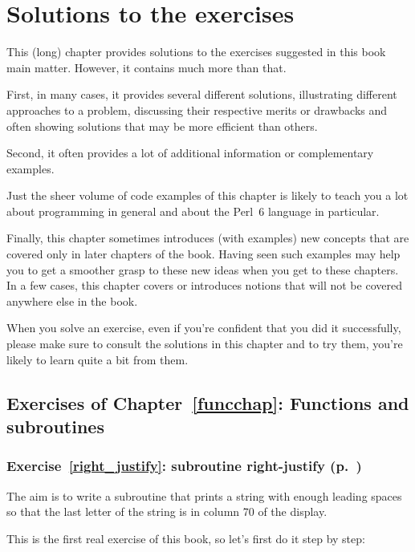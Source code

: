\chapter{Solutions to the exercises}

This (long) chapter provides solutions to the exercises 
suggested in this book main matter. However, it contains 
much more than that.

First, in many cases, it provides several different solutions, 
illustrating different approaches to a problem, discussing 
their respective merits or drawbacks and often 
showing solutions that may be more efficient than others.

Second, it often provides a lot of additional information 
or complementary examples.

Just the sheer volume of code examples of this chapter is 
likely to teach you a lot about programming in general and 
about the Perl~6 language in particular.

Finally, this chapter sometimes introduces (with examples) new 
concepts that are covered only in later chapters of the book. 
Having seen such examples may help you to get a smoother 
grasp to these new ideas when you get to these chapters. 
In a few cases, this chapter covers or introduces notions 
that will not be covered anywhere else in the book.

When you solve an exercise, even if you're confident that you 
did it successfully, please make sure to consult the solutions 
in this chapter and to try them, you're likely to learn quite 
a bit from them.

\section{Exercises of Chapter~\ref{funcchap}: Functions and subroutines}

\subsection{Exercise~\ref{right_justify}: subroutine right-justify (p.~\pageref{right_justify})}
\label{sol_right_justify}

The aim is to write a subroutine that prints a string
with enough leading spaces so that the last letter 
of the string is in column 70 of the display.

This is the first real exercise of this book, so let's first 
do it step by step:

